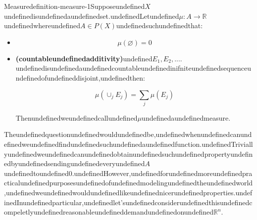 \begin{mystthmdefinition}{Measure}{definition-measure-1}Supposeundefined$X$undefinedisundefinedaundefinedset.undefinedLetundefined$\mu: A \to \mathbb{R}$undefinedwhereundefined$A\in P(X)$undefinedsuchundefinedthat:

\begin{itemize}
\item \begin{equation}
\mu(\varnothing)=0
\end{equation}


\item \textbf{(countableundefinedadditivity)}undefined$E_1,E_2,....$undefinedisundefinedaundefinedcountableundefinedinifniteundefinedsequenceundefinedofundefineddisjoint,undefinedthen:

\begin{equation}
\mu(\cup_j E_j)=\sum_j \mu(E_j)
\end{equation}


Thenundefinedweundefinedcallundefined$\mu$undefinedaundefinedmeasure.
\end{itemize}

\end{mystthmdefinition}
Theundefinedquestionundefinedwouldundefinedbe,undefinedwhenundefinedcanundefinedweundefinedfindundefinedsuchundefinedaundefinedfunction.undefinedTriviallyundefinedweundefinedcanundefinedobtainundefinedsuchundefinedpropertyundefinedbyundefinedsendingundefinedeveryundefined$A$undefinedtoundefined0.undefinedHowever,undefinedforundefinedmoreundefinedpracticalundefinedpurposesundefinedofundefinedmodelingundefinedtheundefinedworld,undefinedweundefinedwouldundefinedlikeundefinednicerundefinedproperties.undefinedInundefinedparticular,undefinedlet'sundefinedconsiderundefinedthisundefinedcompeletlyundefinedreasonableundefineddemandundefinedonundefined$\mathbb{R}^n$.

